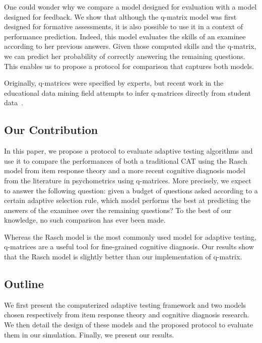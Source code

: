 \documentclass{edm_template}
\begin{document}
One could wonder why we compare a model designed for evaluation with a model designed for feedback. We show that although the q-matrix model was first designed for formative assessments, it is also possible to use it in a context of performance prediction. Indeed, this model evaluates the skills of an examinee according to her previous answers. Given those computed skills and the q-matrix, we can predict her probability of correctly answering the remaining questions. This enables us to propose a protocol for comparison that captures both models.

Originally, q-matrices were specified by experts, but recent work in the educational data mining field attempts to infer q-matrices directly from student data~\cite{Huebner2010}. %

\subsection{Our Contribution}

In this paper, we propose a protocol to evaluate adaptive testing algorithms and use it to compare the performances of both a traditional CAT using the Rasch model from item response theory and a more recent cognitive diagnosis model from the literature in psychometrics using q-matrices. More precisely, we expect to answer the following question: given a budget of questions asked according to a certain adaptive selection rule, which model performs the best at predicting the answers of the examinee over the remaining questions? To the best of our knowledge, no such comparison has ever been made.

Whereas the Rasch model is the most commonly used model for adaptive testing, q-matrices are a useful tool for fine-grained cognitive diagnosis. Our results show that the Rasch model is slightly better than our implementation of q-matrix.

\subsection{Outline}

We first present the computerized adaptive testing framework and two models chosen respectively from item response theory and cognitive diagnosis research. We then detail the design of these models and the proposed protocol to evaluate them in our simulation. Finally, we present our results.
\end{document}
